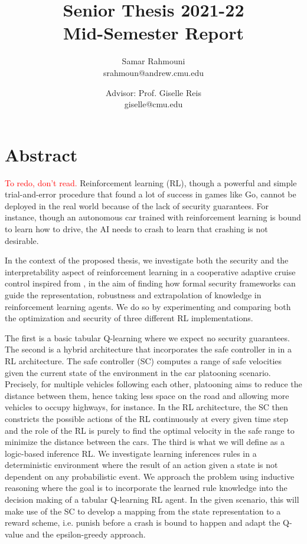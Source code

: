 \documentclass[a4paper,11pt]{article}
\author{%
  \begin{minipage}[t]{0.47\textwidth}
    \centering
    Samar Rahmouni \\ srahmoun@andrew.cmu.edu
  \end{minipage}
  \and
  \begin{minipage}[t]{0.45\textwidth}
    \centering
    Advisor: Prof. Giselle Reis \\ giselle@cmu.edu
  \end{minipage}%
  \vspace*{2ex}
}
\date{}
\title{{\Large\sc Senior Thesis 2021-22\\[2ex]}{\LARGE\bf Mid-Semester Report\vspace*{3ex}}}
\begin{document}
\maketitle 

\section{Abstract}
\textcolor{red}{To redo, don't read.}
Reinforcement learning (RL), though a powerful and simple trial-and-error procedure that found a lot of success in games like Go, cannot be deployed in the real world 
because of the lack of security guarantees. For instance, though an autonomous car trained with reinforcement learning is bound to learn how to drive, the AI needs to crash 
to learn that crashing is not desirable. 

\medskip

In the context of the proposed thesis, we investigate both the security and the interpretability aspect of reinforcement learning in a cooperative adaptive cruise control inspired from \cite{vnc20},
in the aim of finding how formal security frameworks can guide the representation, robustness and extrapolation of knowledge in reinforcement
learning agents. We do so by experimenting and comparing both the optimization and security of three different RL implementations. 

\medskip

The first is a basic tabular Q-learning where we expect no security guarantees. The second is a hybrid architecture that incorporates the safe controller in \cite{vnc20} in a RL architecture. 
The safe controller (SC) computes a range of safe velocities given the current state of the environment in the car platooning scenario. Precisely, for multiple vehicles following each other, platooning aims to reduce the distance between them, hence taking less space on the road 
and allowing more vehicles to occupy highways, for instance. In the RL architecture, the SC then constricts the possible actions of the RL continuously at every given time step and the role of the RL is purely 
to find the optimal velocity in the safe range to minimize the distance between the cars. The third is what we will define as a logic-based inference RL. We investigate learning inferences rules in a deterministic environment 
where the result of an action given a state is not dependent on any probabilistic event. We approach the problem using inductive reasoning where the goal is to incorporate the learned rule knowledge into the decision making of a tabular Q-learning RL agent. 
In the given scenario, this will make use of the SC to develop a mapping from the state representation to a reward scheme, i.e. punish before a crash is bound to happen and adapt the Q-value and the epsilon-greedy approach. 
\end{document}
